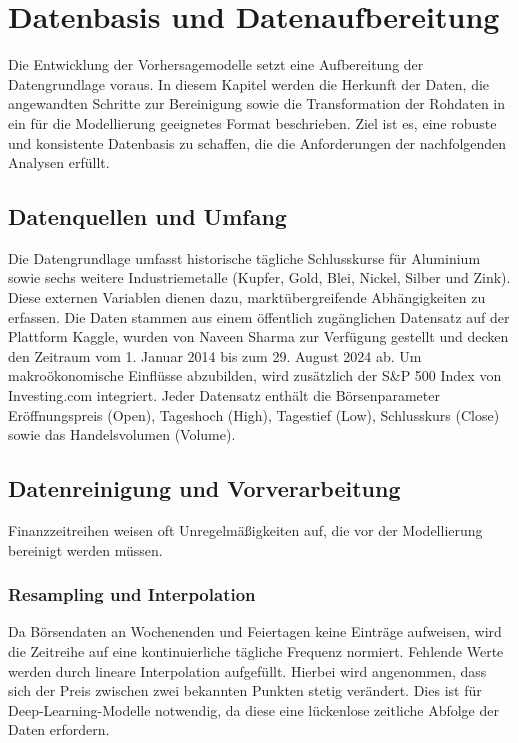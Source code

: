 \section{Datenbasis und Datenaufbereitung}
\label{sec:datenbasis_und_datenaufbereitung}

Die Entwicklung der Vorhersagemodelle setzt eine Aufbereitung der Datengrundlage voraus.
In diesem Kapitel werden die Herkunft der Daten, die angewandten Schritte zur Bereinigung sowie die Transformation der Rohdaten in ein für die Modellierung geeignetes Format beschrieben.
Ziel ist es, eine robuste und konsistente Datenbasis zu schaffen, die die Anforderungen der nachfolgenden Analysen erfüllt.

\subsection{Datenquellen und Umfang}

Die Datengrundlage umfasst historische tägliche Schlusskurse für Aluminium sowie sechs weitere Industriemetalle (Kupfer, Gold, Blei, Nickel, Silber und Zink).
Diese externen Variablen dienen dazu, marktübergreifende Abhängigkeiten zu erfassen.
Die Daten stammen aus einem öffentlich zugänglichen Datensatz auf der Plattform Kaggle, wurden von Naveen Sharma \cite{Metals} zur Verfügung gestellt und decken den Zeitraum vom 1. Januar 2014 bis zum 29. August 2024 ab.
Um makroökonomische Einflüsse abzubilden, wird zusätzlich der S\&P 500 Index von Investing.com \cite{SP2026} integriert.
Jeder Datensatz enthält die Börsenparameter Eröffnungspreis (Open), Tageshoch (High), Tagestief (Low), Schlusskurs (Close) sowie das Handelsvolumen (Volume).

\subsection{Datenreinigung und Vorverarbeitung}

Finanzzeitreihen weisen oft Unregelmäßigkeiten auf, die vor der Modellierung bereinigt werden müssen.

\subsubsection{Resampling und Interpolation}
Da Börsendaten an Wochenenden und Feiertagen keine Einträge aufweisen, wird die Zeitreihe auf eine kontinuierliche tägliche Frequenz normiert.
Fehlende Werte werden durch lineare Interpolation aufgefüllt.
Hierbei wird angenommen, dass sich der Preis zwischen zwei bekannten Punkten stetig verändert.
Dies ist für Deep-Learning-Modelle notwendig, da diese eine lückenlose zeitliche Abfolge der Daten erfordern.

